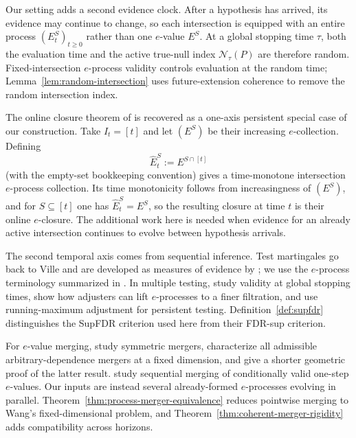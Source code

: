 \documentclass[11pt]{article}
\numberwithin{equation}{section}
\theoremstyle{plain}
\theoremstyle{definition}
\newcommand{\calN}{\mathcal N}
\begin{document}
Our setting adds a second evidence clock. After a hypothesis has arrived, its evidence may continue to change, so each intersection is
equipped with an entire process $(E_t^S)_{t\geq0}$ rather than one
$e$-value $E^S$. At a global stopping time $\tau$, both the evaluation
time and the active true-null index $\calN_\tau(P)$ are therefore
random. Fixed-intersection $e$-process validity controls evaluation at
the random time; Lemma~\ref{lem:random-intersection} uses
future-extension coherence to remove the random intersection index.

The online closure theorem of \citet{XuFischerRamdas2026Online} is
recovered as a one-axis persistent special case of our construction.
Take $I_t=[t]$ and let $(E^S)$ be their increasing $e$-collection.
Defining
\[
\widehat E_t^S:=E^{S\cap[t]}
\]
(with the empty-set bookkeeping convention) gives a time-monotone
intersection $e$-process collection. Its time monotonicity follows
from increasingness of $(E^S)$, and for $S\subseteq[t]$ one has
$\widehat E_t^S=E^S$, so the resulting closure at time $t$ is their
online $e$-closure. The additional work here is needed when evidence
for an already active intersection continues to evolve between
hypothesis arrivals.

The second temporal axis comes from sequential inference. Test martingales go back to Ville \citep{Ville1939} and are developed as measures of evidence by \citet{ShaferEtAl2011TestMartingales}; we use the $e$-process terminology summarized in \citet{RamdasWangBook}. In multiple testing, \citet{WangDandapanthulaRamdas2025} study validity at global stopping times, \citet{ChoeRamdas2026} show how adjusters can lift $e$-processes to a finer filtration, and \citet{TavyrikovGoemanDeHeide2026} use running-maximum adjustment for persistent testing. Definition~\ref{def:supfdr} distinguishes the SupFDR criterion used here from their FDR-sup criterion.

For $e$-value merging, \citet{VovkWang2021} study symmetric mergers, \citet{Wang2025Merging} characterize all admissible arbitrary-dependence mergers at a fixed dimension, and \citet{Clerico2026Merging} give a shorter geometric proof of the latter result. \citet{VovkWang2024Sequential} study sequential merging of conditionally valid one-step $e$-values. Our inputs are instead several already-formed $e$-processes evolving in parallel. Theorem~\ref{thm:process-merger-equivalence} reduces pointwise merging to Wang's fixed-dimensional problem, and Theorem~\ref{thm:coherent-merger-rigidity} adds compatibility across horizons.
\end{document}
